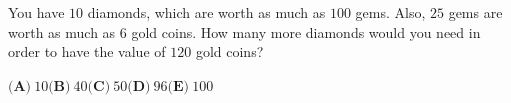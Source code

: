 You have $10$ diamonds, which are worth as much as $100$ gems. Also, $25$ gems are worth as much as $6$ gold coins. How many more diamonds would you need in order to have the value of $120$ gold coins?

$\textbf{(A)}\ 10$\qquad$\textbf{(B)}\ 40$\qquad$\textbf{(C)}\ 50$\qquad$\textbf{(D)}\ 96$\qquad$\textbf{(E)}\ 100$
